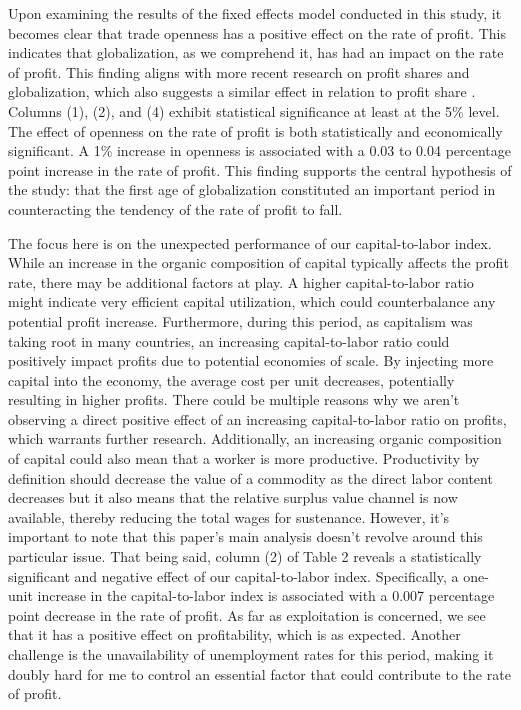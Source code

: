 \documentclass[10pt]{article}
\begin{document}
\par Upon examining the results of the fixed effects model conducted in this study, it becomes clear that trade openness has a positive effect on the rate of profit. This indicates that globalization, as we comprehend it, has had an impact on the rate of profit. This finding aligns with more recent research on profit shares and globalization, which also suggests a similar effect in relation to profit share \citep{Stockhammer2017}. Columns (1), (2), and (4) exhibit statistical significance at least at the 5\% level. The effect of openness on the rate of profit is both statistically and economically significant. A 1\% increase in openness is associated with a 0.03 to 0.04 percentage point increase in the rate of profit. This finding supports the central hypothesis of the study: that the first age of globalization constituted an important period in counteracting the tendency of the rate of profit to fall.
\par The focus here is on the unexpected performance of our capital-to-labor index. While an increase in the organic composition of capital typically affects the profit rate, there may be additional factors at play. A higher capital-to-labor ratio might indicate very efficient capital utilization, which could counterbalance any potential profit increase. Furthermore, during this period, as capitalism was taking root in many countries, an increasing capital-to-labor ratio could positively impact profits due to potential economies of scale. By injecting more capital into the economy, the average cost per unit decreases, potentially resulting in higher profits. There could be multiple reasons why we aren't observing a direct positive effect of an increasing capital-to-labor ratio on profits, which warrants further research. Additionally, an increasing organic composition of capital could also mean that a worker is more productive. Productivity by definition should decrease the value of a commodity as the direct labor content decreases but it also means that the relative surplus value channel is now available, thereby reducing the total wages for sustenance. However, it's important to note that this paper's main analysis doesn't revolve around this particular issue. That being said, column (2) of Table 2 reveals a statistically significant and negative effect of our capital-to-labor index. Specifically, a one-unit increase in the capital-to-labor index is associated with a 0.007 percentage point decrease in the rate of profit. As far as exploitation is concerned, we see that it has a positive effect on profitability, which is as expected. Another challenge is the unavailability of unemployment rates for this period, making it doubly hard for me to control an essential factor that could contribute to the rate of profit. 
\end{document}
